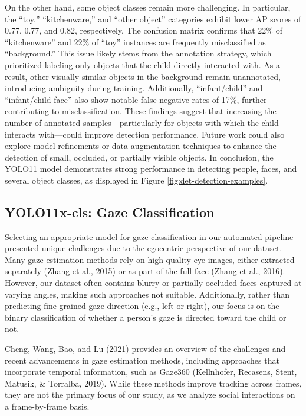 \documentclass[
  man,floatsintext]{apa6}
\begin{document}
On the other hand, some object classes remain more challenging. In particular, the ``toy,'' ``kitchenware,'' and ``other object'' categories exhibit lower AP scores of 0.77, 0.77, and 0.82, respectively. The confusion matrix confirms that 22\% of ``kitchenware'' and 22\% of ``toy'' instances are frequently misclassified as ``background.'' This issue likely stems from the annotation strategy, which prioritized labeling only objects that the child directly interacted with. As a result, other visually similar objects in the background remain unannotated, introducing ambiguity during training. Additionally, ``infant/child'' and ``infant/child face'' also show notable false negative rates of 17\%, further contributing to misclassification. These findings suggest that increasing the number of annotated samples---particularly for objects with which the child interacts with---could improve detection performance. Future work could also explore model refinements or data augmentation techniques to enhance the detection of small, occluded, or partially visible objects. In conclusion, the YOLO11 model demonstrates strong performance in detecting people, faces, and several object classes, as displayed in Figure \ref{fig:det-detection-examples}.

\subsection{YOLO11x-cls: Gaze Classification}\label{sup-yolo11x-cls}

Selecting an appropriate model for gaze classification in our automated pipeline presented unique challenges due to the egocentric perspective of our dataset. Many gaze estimation methods rely on high-quality eye images, either extracted separately (Zhang et al., 2015) or as part of the full face (Zhang et al., 2016). However, our dataset often contains blurry or partially occluded faces captured at varying angles, making such approaches not suitable. Additionally, rather than predicting fine-grained gaze direction (e.g., left or right), our focus is on the binary classification of whether a person's gaze is directed toward the child or not.

Cheng, Wang, Bao, and Lu (2021) provides an overview of the challenges and recent advancements in gaze estimation methods, including approaches that incorporate temporal information, such as Gaze360 (Kellnhofer, Recasens, Stent, Matusik, \& Torralba, 2019). While these methods improve tracking across frames, they are not the primary focus of our study, as we analyze social interactions on a frame-by-frame basis.
\end{document}
